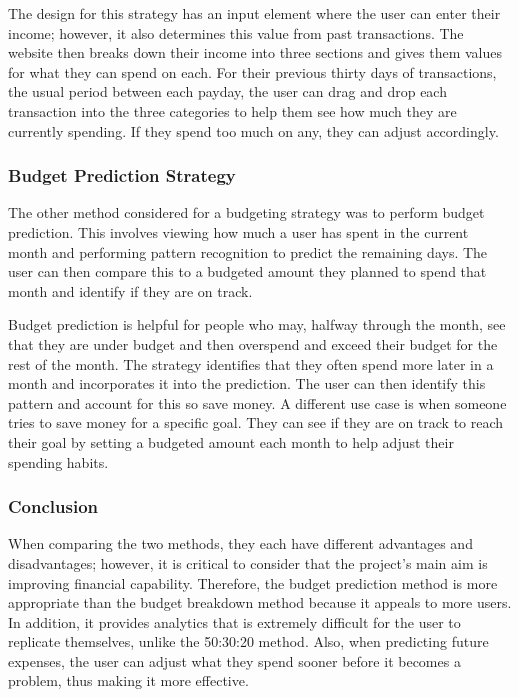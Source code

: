 The design for this strategy has an input element where the user can enter their income; however, it also determines this value from past transactions. The website then breaks down their income into three sections and gives them values for what they can spend on each. For their previous thirty days of transactions, the usual period between each payday, the user can drag and drop each transaction into the three categories to help them see how much they are currently spending. If they spend too much on any, they can adjust accordingly.

\subsubsection{Budget Prediction Strategy}
The other method considered for a budgeting strategy was to perform budget prediction. This involves viewing how much a user has spent in the current month and performing pattern recognition to predict the remaining days. The user can then compare this to a budgeted amount they planned to spend that month and identify if they are on track.

Budget prediction is helpful for people who may, halfway through the month, see that they are under budget and then overspend and exceed their budget for the rest of the month. The strategy identifies that they often spend more later in a month and incorporates it into the prediction. The user can then identify this pattern and account for this so save money. A different use case is when someone tries to save money for a specific goal. They can see if they are on track to reach their goal by setting a budgeted amount each month to help adjust their spending habits.

\subsubsection{Conclusion}
When comparing the two methods, they each have different advantages and disadvantages; however, it is critical to consider that the project's main aim is improving financial capability. Therefore, the budget prediction method is more appropriate than the budget breakdown method because it appeals to more users. In addition, it provides analytics that is extremely difficult for the user to replicate themselves, unlike the 50:30:20 method. Also, when predicting future expenses, the user can adjust what they spend sooner before it becomes a problem, thus making it more effective.

